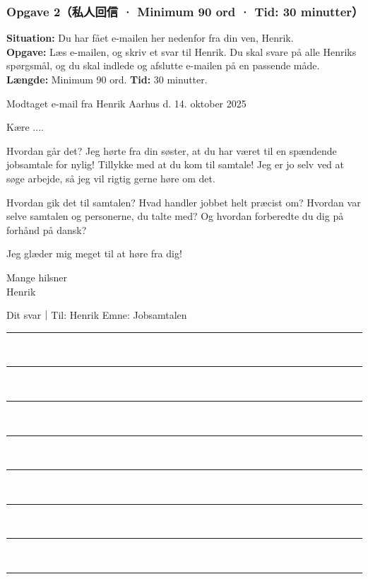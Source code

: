 \subsubsection*{Opgave 2（私人回信 · Minimum 90 ord · Tid: 30 minutter）}

\textbf{Situation:} Du har fået e-mailen her nedenfor fra din ven, Henrik.\\
\textbf{Opgave:} Læs e-mailen, og skriv et svar til Henrik. Du skal svare på alle Henriks spørgsmål, og du skal indlede og afslutte e-mailen på en passende måde.\\
\textbf{Længde:} Minimum 90 ord. \qquad \textbf{Tid:} 30 minutter.

\begin{emailbox}{Modtaget e-mail fra Henrik}
\hfill Aarhus d. 14. oktober 2025

Kære ....

Hvordan går det? Jeg hørte fra din søster, at du har været til en spændende jobsamtale for nylig! Tillykke med at du kom til samtale! Jeg er jo selv ved at søge arbejde, så jeg vil rigtig gerne høre om det.

Hvordan gik det til samtalen? Hvad handler jobbet helt præcist om? Hvordan var selve samtalen og personerne, du talte med? Og hvordan forberedte du dig på forhånd på dansk?

Jeg glæder mig meget til at høre fra dig!

Mange hilsner\\
Henrik
\end{emailbox}

\begin{emailbox}{Dit svar｜Til: Henrik \qquad Emne: Jobsamtalen}
\vspace{0.25em}
\rule{\linewidth}{0.4pt}\\[0.52em]
\rule{\linewidth}{0.4pt}\\[0.52em]
\rule{\linewidth}{0.4pt}\\[0.52em]
\rule{\linewidth}{0.4pt}\\[0.52em]
\rule{\linewidth}{0.4pt}\\[0.52em]
\rule{\linewidth}{0.4pt}\\[0.52em]
\rule{\linewidth}{0.4pt}\\[0.52em]
\rule{\linewidth}{0.4pt}
\end{emailbox}



